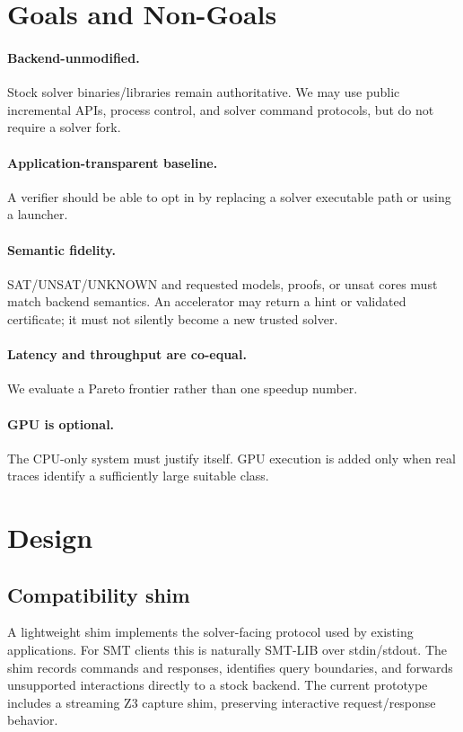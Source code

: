 \documentclass[10pt,twocolumn]{article}
\begin{document}
\section{Goals and Non-Goals}
\paragraph{Backend-unmodified.} Stock solver binaries/libraries remain authoritative. We may use public incremental APIs, process control, and solver command protocols, but do not require a solver fork.
\paragraph{Application-transparent baseline.} A verifier should be able to opt in by replacing a solver executable path or using a launcher.
\paragraph{Semantic fidelity.} SAT/UNSAT/UNKNOWN and requested models, proofs, or unsat cores must match backend semantics. An accelerator may return a hint or validated certificate; it must not silently become a new trusted solver.
\paragraph{Latency and throughput are co-equal.} We evaluate a Pareto frontier rather than one speedup number.
\paragraph{GPU is optional.} The CPU-only system must justify itself. GPU execution is added only when real traces identify a sufficiently large suitable class.

\section{Design}
\subsection{Compatibility shim}
A lightweight shim implements the solver-facing protocol used by existing applications. For SMT clients this is naturally SMT-LIB over stdin/stdout. The shim records commands and responses, identifies query boundaries, and forwards unsupported interactions directly to a stock backend. The current prototype includes a streaming Z3 capture shim, preserving interactive request/response behavior.
\end{document}
